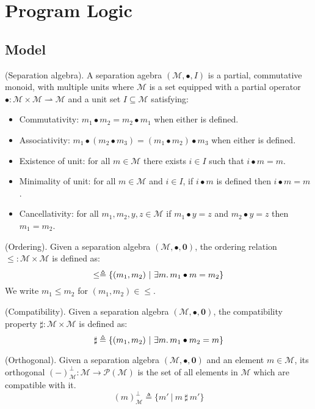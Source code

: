 \section{Program Logic}

\subsection{Model}

 (Separation algebra). A separation agebra $(\mathcal{M}, \bullet, I)$ is a partial, commutative monoid, with multiple units where $\mathcal{M}$ is a set equipped with a partial operator $\bullet : \mathcal{M} \times \mathcal{M} \rightharpoonup \mathcal{M}$ and a unit set $I \subseteq \mathcal{M}$ satisfying:
\begin{itemize}
\item Commutativity: $m_1 \bullet m_2 = m_2 \bullet m_1$ when either is defined.
\item Associativity: $m_1 \bullet (m_2 \bullet m_3) = (m_1 \bullet m_2) \bullet m_3$ when either is defined.
\item Existence of unit: for all $m \in \mathcal{M}$ there exists $i \in I$ such that $i \bullet m = m$.
\item Minimality of unit: for all $m \in \mathcal{M}$ and $i \in I$, if $i \bullet m$ is defined then $i \bullet m = m$.
\item Cancellativity: for all $m_1, m_2, y, z \in \mathcal{M}$ if $m_1 \bullet y = z$ and $m_2 \bullet y = z$ then $m_1 = m_2$.
\end{itemize}

 (Ordering). Given a separation algebra $(\mathcal{M}, \bullet, \mathbf{0})$, the ordering relation $\leq : \mathcal{M} \times \mathcal{M}$ is defined as:
\[
	\leq \triangleq \{ (m_1, m_2)\ |\ \exists m \ldotp m_1 \bullet m = m_2 \}
\]
We write $m_1 \leq m_2$ for $(m_1, m_2) \in \leq$.

 (Compatibility). Given a separation algebra $(\mathcal{M}, \bullet, \mathbf{0})$, the compatibility property $\sharp : \mathcal{M} \times \mathcal{M}$ is defined as:
\[
	\sharp \triangleq \{ (m_1, m_2)\ |\ \exists m \ldotp m_1 \bullet m_2 = m \}
\]

 (Orthogonal). Given a separation algebra $(\mathcal{M}, \bullet, \mathbf{0})$ and an element $m \in \mathcal{M}$, its orthogonal $(-)^\bot_\mathcal{M} : \mathcal{M} \rightarrow \mathcal{P}(\mathcal{M})$ is the set of all elements in $\mathcal{M}$ which are compatible with it.
\[
	(m)^\bot_\mathcal{M} \triangleq \{m'\ |\ m\ \sharp\ m' \}
\]

